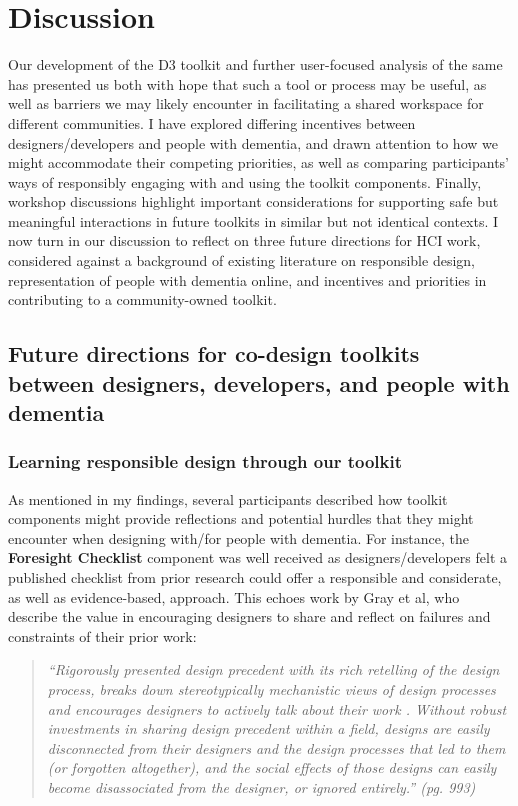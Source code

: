 \section{Discussion}
\label{D3:Discussion}
Our development of the D3 toolkit and further user-focused analysis of the same has presented us both with hope that such a tool or process may be useful, as well as barriers we may likely encounter in facilitating a shared workspace for different communities. I have explored differing incentives between designers/developers and people with dementia, and drawn attention to how we might accommodate their competing priorities, as well as comparing participants’ ways of responsibly engaging with and using the toolkit components. Finally, workshop discussions highlight important considerations for supporting safe but meaningful interactions in future toolkits in similar but not identical contexts. I now turn in our discussion to reflect on three future directions for HCI work, considered against a background of existing literature on responsible design, representation of people with dementia online, and incentives and priorities in contributing to a community-owned toolkit.

\subsection{Future directions for co-design toolkits between designers, developers, and people with dementia}

\subsubsection{Learning responsible design through our toolkit}
As mentioned in my findings, several participants described how toolkit components might provide reflections and potential hurdles that they might encounter when designing with/for people with dementia. For instance, the \textbf{Foresight Checklist} component was well received as designers/developers felt a published checklist from prior research could offer a responsible and considerate, as well as evidence-based, approach. This echoes work by Gray et al, who describe the value in encouraging designers to share and reflect on failures and constraints of their prior work:

\begin{quote}
    
\textit{“Rigorously presented design precedent with its rich retelling of the design process, breaks down stereotypically mechanistic views of design processes and encourages designers to actively talk about their work \citep{boling2015designerly,smith2010producing}. Without robust investments in sharing design precedent within a field, designs are easily disconnected from their designers and the design processes that led to them (or forgotten altogether), and the social effects of those designs can easily become disassociated from the designer, or ignored entirely.” (pg. 993) \citep{gray2016inscribing}}
\end{quote}

